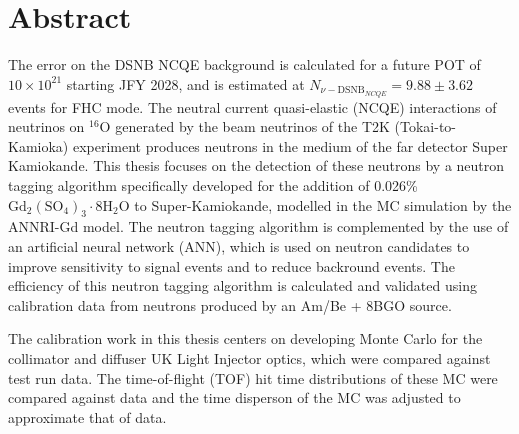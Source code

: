 \chapter*{Abstract}
\thispagestyle{empty}

The error on the DSNB NCQE background is calculated for a future POT of $10 \times 10^{21}$ starting JFY 2028, and is estimated at $N_{\nu-\mathrm{DSNB}_{NCQE}}= 9.88 \pm 3.62$ events for FHC mode. The neutral current quasi-elastic (NCQE) interactions of neutrinos on ${ }^{16} \mathrm{O}$ generated by the beam neutrinos of the T2K (Tokai-to-Kamioka) experiment produces neutrons in the medium of the far detector Super Kamiokande. This thesis focuses on the detection of these neutrons by a neutron tagging algorithm specifically developed for the addition of 0.026\% $\mathrm{Gd}_{2}\left(\mathrm{SO}_{4}\right)_{3} \cdot 8 \mathrm{H}_{2} \mathrm{O}$ to Super-Kamiokande, modelled in the MC simulation by the ANNRI-Gd model. The neutron tagging algorithm is complemented by the use of an artificial neural network (ANN), which is used on neutron candidates to improve sensitivity to signal events and to reduce backround events. The efficiency of this neutron tagging algorithm is calculated and validated using calibration data from neutrons produced by an Am/Be + 8BGO source.

The calibration work in this thesis centers on developing Monte Carlo for the collimator and diffuser UK Light Injector optics, which were compared against test run data. The time-of-flight (TOF) hit time distributions of these MC were compared against data and the time disperson of the MC was adjusted to approximate that of data.